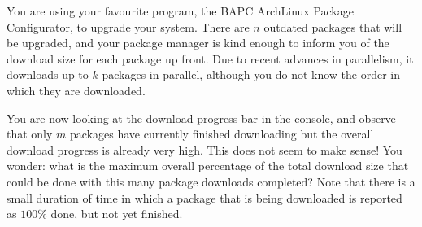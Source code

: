 





You are using your favourite program, the BAPC ArchLinux Package Configurator, to upgrade your
system. There are $n$ outdated packages that will be upgraded, and your package
manager is kind enough to inform you of the download size for each package up front.
Due to recent advances in parallelism, it downloads up to $k$ packages in
parallel, although you do not know the order in which they are downloaded.

You are now looking at the download progress bar in the console, and observe that
only $m$ packages have currently finished downloading but the overall download progress
is already very high. This does not seem to make sense! You wonder: what is the maximum overall percentage
of the total download size that could be done with this many package downloads completed?
Note that there is a small duration of
time in which a package that is being downloaded is reported as $100\%$ done, but not
yet finished.

